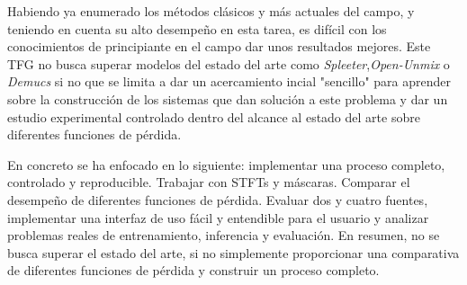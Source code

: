 Habiendo ya enumerado los métodos clásicos y más actuales del campo, y teniendo en cuenta su alto desempeño en esta tarea, es difícil con los conocimientos de principiante en el campo dar unos resultados mejores. Este TFG no busca superar modelos del estado del arte como \textit{Spleeter},\textit{Open-Unmix} o \textit{Demucs} si no que se limita a dar un acercamiento incial "sencillo" para aprender sobre la construcción de los sistemas que dan solución a este problema y dar un estudio experimental controlado dentro del alcance al estado del arte sobre diferentes funciones de pérdida.

En concreto se ha enfocado en lo siguiente: implementar una proceso completo, controlado y reproducible. Trabajar con STFTs y máscaras. Comparar el desempeño de diferentes funciones de pérdida. Evaluar dos y cuatro fuentes, implementar una interfaz de uso fácil y entendible para el usuario y analizar problemas reales de entrenamiento, inferencia y evaluación. En resumen, no se busca superar el estado del arte, si no simplemente proporcionar una comparativa de diferentes funciones de pérdida y construir un proceso completo.